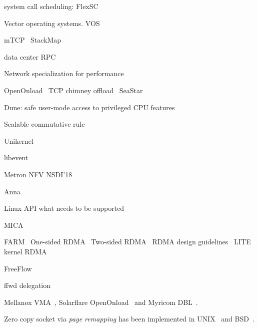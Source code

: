system call scheduling:
FlexSC~\cite{soares2010flexsc}

Vector operating systems.
VOS~\cite{vasudevan2011case}

mTCP~\cite{jeong2014mtcp}
StackMap~\cite{yasukata2016stackmap}

data center RPC~\cite{stuedi2014darpc}

Network specialization for performance~\cite{marinos2014network}

OpenOnload~\cite{openonload}
TCP chimney offload~\cite{networking2004network}
SeaStar~\cite{seastar}

Dune: safe user-mode access to privileged CPU features~\cite{belay2012dune}

Scalable commutative rule~\cite{clements2015scalable}

Unikernel~\cite{madhavapeddy2013unikernels}

libevent~\cite{libevent}

Metron NFV NSDI'18~\cite{metron2018nsdi}

Anna~\cite{anna}

Linux API what needs to be supported~\cite{tsai2016study}

MICA~\cite{lim2014mica}

FARM~\cite{dragojevic2014farm}
One-sided RDMA~\cite{mitchell2013using}
Two-sided RDMA~\cite{kalia2014using}
RDMA design guidelines~\cite{kaminsky2016design}
LITE kernel RDMA~\cite{tsai2017lite}

FreeFlow~\cite{freeflow}


ffwd delegation~\cite{roghanchi2017ffwd}

Mellanox VMA~\cite{libvma}, Solarflare OpenOnload~\cite{openonload} and Myricom DBL~\cite{dbl}.

Zero copy socket via \textit{page remapping} has been implemented in UNIX~\cite{thadani1995efficient} and BSD~\cite{chu1996zero}. 
